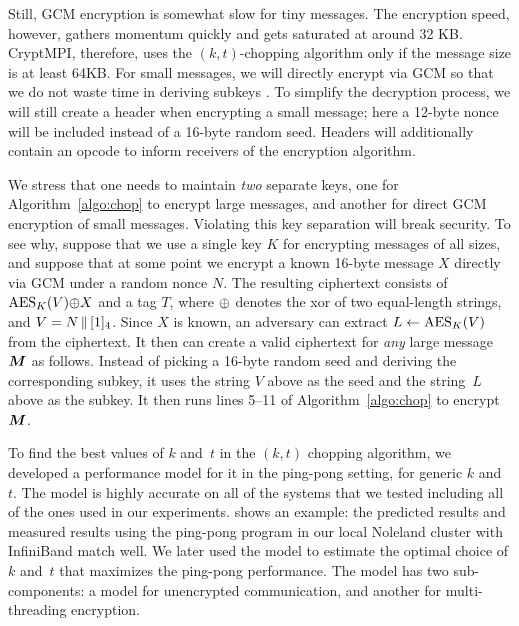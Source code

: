Still, GCM encryption is somewhat slow for tiny messages.
The encryption speed, however, gathers momentum quickly and gets saturated at around 32 KB.
CryptMPI, therefore,
uses the $(k, t)$-chopping algorithm only if the message size is at least 64KB.
For small messages, we will directly encrypt via GCM so that we do not waste time in deriving subkeys
.
To simplify the decryption process, we will still create a header when encrypting a small message;
here a 12-byte nonce will be included instead of a 16-byte random seed.
Headers will additionally contain an opcode to inform receivers of the encryption algorithm.

We stress that one needs to maintain \emph{two} separate keys, one for Algorithm~\ref{algo:chop}
to encrypt large messages,
and another for direct GCM encryption of small messages.
Violating this key separation will break security.
To see why, suppose that we use a single key $K$ for encrypting messages of all sizes,
and suppose that at some point we encrypt a known 16-byte message $X$ directly via GCM under a random
 nonce $N$.
 The resulting ciphertext consists of $\mathrm{AES}_K(V) {\oplus} X$ and a tag $T$,
 where ${\oplus}$ denotes the xor of two equal-length strings, and $V = N {\,\|\,} [1]_{4}$.
 Since $X$ is known, an adversary can extract $L \gets \mathrm{AES}_K(V)$ from the ciphertext.
 It then can create a valid ciphertext for \emph{any} large message $\bm{M}$ as follows.
 Instead of picking a 16-byte random seed and deriving the corresponding subkey,
 it uses the string $V$ above as the seed and the string~$L$ above as the subkey.
 It then runs lines 5--11 of Algorithm~\ref{algo:chop} to encrypt $\bm{M}$.

To find the best values of $k$ and~$t$ in the $(k, t)$ chopping algorithm, 
we developed a performance model for it in the ping-pong setting, 
for generic $k$ and~$t$. The model is highly accurate on all of the systems
that we tested including all of the ones used in our experiments.
 shows an example: the predicted results and measured
results using the ping-pong program in our local Noleland cluster with InfiniBand match well.   
We later used the model to estimate the optimal choice of $k$ and~$t$ that maximizes the 
ping-pong performance. 
The model has two sub-components: a model for
unencrypted communication, and another for multi-threading encryption.


